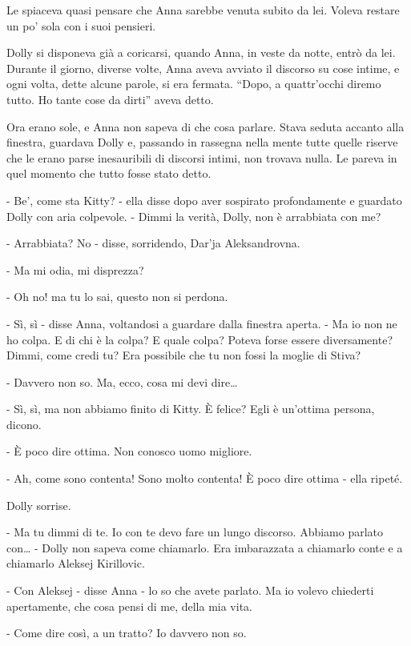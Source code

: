 Le spiaceva quasi pensare che Anna sarebbe venuta subito da lei. Voleva restare un po' sola con i suoi pensieri. 

Dolly si disponeva già a coricarsi, quando Anna, in veste da notte, entrò da lei. \\
Durante il giorno, diverse volte, Anna aveva avviato il discorso su cose intime, e ogni volta, dette alcune parole, si era fermata. ``Dopo, a quattr'occhi diremo tutto. Ho tante cose da dirti'' aveva detto. 

Ora erano sole, e Anna non sapeva di che cosa parlare. Stava seduta accanto alla finestra, guardava Dolly e, passando in rassegna nella mente tutte quelle riserve che le erano parse inesauribili di discorsi intimi, non trovava nulla. Le pareva in quel momento che tutto fosse stato detto. 

- Be', come sta Kitty? - ella disse dopo aver sospirato profondamente e guardato Dolly con aria colpevole. - Dimmi la verità, Dolly, non è arrabbiata con me? 

- Arrabbiata? No - disse, sorridendo, Dar'ja Aleksandrovna. 

- Ma mi odia, mi disprezza? 

- Oh no! ma tu lo sai, questo non si perdona. 

- Sì, sì - disse Anna, voltandosi a guardare dalla finestra aperta. - Ma io non ne ho colpa. E di chi è la colpa? E quale colpa? Poteva forse essere diversamente? Dimmi, come credi tu? Era possibile che tu non fossi la moglie di Stiva? 

- Davvero non so. Ma, ecco, cosa mi devi dire\ldots{} 

- Sì, sì, ma non abbiamo finito di Kitty. È felice? Egli è un'ottima persona, dicono. 

- È poco dire ottima. Non conosco uomo migliore. 

- Ah, come sono contenta! Sono molto contenta! È poco dire ottima - ella ripeté. 

Dolly sorrise. 

- Ma tu dimmi di te. Io con te devo fare un lungo discorso. Abbiamo parlato con\ldots{} - Dolly non sapeva come chiamarlo. Era imbarazzata a chiamarlo conte e a chiamarlo Aleksej Kirillovic. 

- Con Aleksej - disse Anna - lo so che avete parlato. Ma io volevo chiederti apertamente, che cosa pensi di me, della mia vita. 

- Come dire così, a un tratto? Io davvero non so. 

